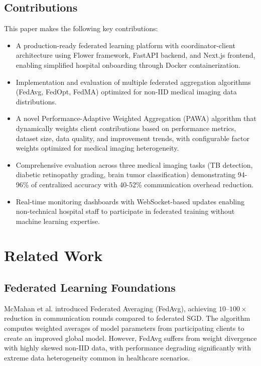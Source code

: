 \documentclass[conference]{IEEEtran}
\begin{document}
\subsection{Contributions}
This paper makes the following key contributions:

\begin{itemize}
\item A production-ready federated learning platform with coordinator-client architecture using Flower framework, FastAPI backend, and Next.js frontend, enabling simplified hospital onboarding through Docker containerization.

\item Implementation and evaluation of multiple federated aggregation algorithms (FedAvg, FedOpt, FedMA) optimized for non-IID medical imaging data distributions.

\item A novel Performance-Adaptive Weighted Aggregation (PAWA) algorithm that dynamically weights client contributions based on performance metrics, dataset size, data quality, and improvement trends, with configurable factor weights optimized for medical imaging heterogeneity.

\item Comprehensive evaluation across three medical imaging tasks (TB detection, diabetic retinopathy grading, brain tumor classification) demonstrating 94-96\% of centralized accuracy with 40-52\% communication overhead reduction.

\item Real-time monitoring dashboards with WebSocket-based updates enabling non-technical hospital staff to participate in federated training without machine learning expertise.
\end{itemize}

\section{Related Work}

\subsection{Federated Learning Foundations}
McMahan et al. \cite{mcmahan2017communication} introduced Federated Averaging (FedAvg), achieving $10$--$100\times$ reduction in communication rounds compared to federated SGD. The algorithm computes weighted averages of model parameters from participating clients to create an improved global model. However, FedAvg suffers from weight divergence with highly skewed non-IID data, with performance degrading significantly with extreme data heterogeneity common in healthcare scenarios.
\end{document}
